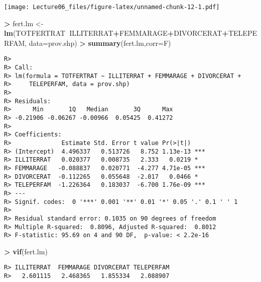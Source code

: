 \documentclass[
]{article}
\newenvironment{Shaded}{\begin{snugshade}}{\end{snugshade}}
\newcommand{\CommentTok}[1]{\textcolor[rgb]{0.56,0.35,0.01}{\textit{#1}}}
\newcommand{\DataTypeTok}[1]{\textcolor[rgb]{0.13,0.29,0.53}{#1}}
\newcommand{\DecValTok}[1]{\textcolor[rgb]{0.00,0.00,0.81}{#1}}
\newcommand{\ErrorTok}[1]{\textcolor[rgb]{0.64,0.00,0.00}{\textbf{#1}}}
\newcommand{\KeywordTok}[1]{\textcolor[rgb]{0.13,0.29,0.53}{\textbf{#1}}}
\newcommand{\NormalTok}[1]{#1}
\newcommand{\OperatorTok}[1]{\textcolor[rgb]{0.81,0.36,0.00}{\textbf{#1}}}
\newcommand{\StringTok}[1]{\textcolor[rgb]{0.31,0.60,0.02}{#1}}
\begin{document}
\texttt{[image: Lecture06\_files/figure-latex/unnamed-chunk-12-1.pdf]}

\begin{Shaded}
\begin{Highlighting}[]
\OperatorTok{>}\StringTok{ }\NormalTok{fert.lm <-}\StringTok{ }\KeywordTok{lm}\NormalTok{(TOTFERTRAT}\OperatorTok{~}\NormalTok{ILLITERRAT}\OperatorTok{+}\NormalTok{FEMMARAGE}\OperatorTok{+}\NormalTok{DIVORCERAT}\OperatorTok{+}\NormalTok{TELEPERFAM, }\DataTypeTok{data=}\NormalTok{prov.shp)}
\OperatorTok{>}\StringTok{ }\KeywordTok{summary}\NormalTok{(fert.lm,}\DataTypeTok{corr=}\NormalTok{F)}
\end{Highlighting}
\end{Shaded}

\begin{verbatim}
R> 
R> Call:
R> lm(formula = TOTFERTRAT ~ ILLITERRAT + FEMMARAGE + DIVORCERAT + 
R>     TELEPERFAM, data = prov.shp)
R> 
R> Residuals:
R>      Min       1Q   Median       3Q      Max 
R> -0.21906 -0.06267 -0.00966  0.05425  0.41272 
R> 
R> Coefficients:
R>              Estimate Std. Error t value Pr(>|t|)    
R> (Intercept)  4.496337   0.513726   8.752 1.13e-13 ***
R> ILLITERRAT   0.020377   0.008735   2.333   0.0219 *  
R> FEMMARAGE   -0.088837   0.020771  -4.277 4.71e-05 ***
R> DIVORCERAT  -0.112265   0.055648  -2.017   0.0466 *  
R> TELEPERFAM  -1.226364   0.183037  -6.700 1.76e-09 ***
R> ---
R> Signif. codes:  0 '***' 0.001 '**' 0.01 '*' 0.05 '.' 0.1 ' ' 1
R> 
R> Residual standard error: 0.1035 on 90 degrees of freedom
R> Multiple R-squared:  0.8096, Adjusted R-squared:  0.8012 
R> F-statistic: 95.69 on 4 and 90 DF,  p-value: < 2.2e-16
\end{verbatim}

\begin{Shaded}
\begin{Highlighting}[]
\OperatorTok{>}\StringTok{ }\KeywordTok{vif}\NormalTok{(fert.lm)}
\end{Highlighting}
\end{Shaded}

\begin{verbatim}
R> ILLITERRAT  FEMMARAGE DIVORCERAT TELEPERFAM 
R>   2.601115   2.468365   1.855334   2.088907
\end{verbatim}

\begin{Shaded}
\end{Shaded}
\end{document}
